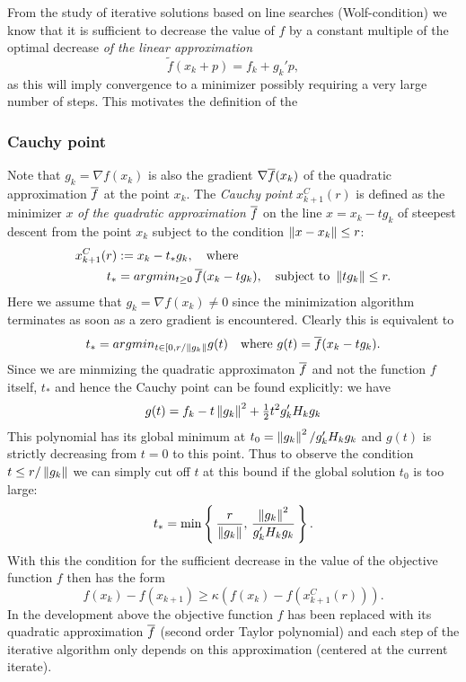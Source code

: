 From the study of iterative solutions based on line searches (Wolf-condition) we know that it
is sufficient to decrease the value of $f$ by a constant multiple of the optimal decrease 
\textit{of the linear approximation}
%
\begin{equation}
\label{TP1}
\tilde f(x_k+p) = f_k + g_k'p,
\end{equation}  
%
as this will imply convergence to a minimizer possibly requiring a very large number of steps.
This motivates the definition of the 

\subsubsection{Cauchy point}
\label{subsubsec:CauchyPoint} 

Note that $g_k=\nabla f(x_k)$ is also the gradient $\nabla\overline f(x_k)$ of the quadratic 
approximation $\overline f$ at the point $x_k$. The \textit{Cauchy point}  $x^C_{k+1}(r)$ is defined 
as the minimizer $x$ \textit{of the quadratic approximation} $\overline f$ on the line $x=x_k-tg_k$ 
of steepest descent from the point $x_k$ subject to the condition $\left\|x-x_k\right\|\leq r$:
%
\begin{align}
\label{Cauchy point}
x^C_{k+1}(r) &:= x_k-t_*g_k,\quad\text{where}\\
t_* &= argmin_{t\geq 0}\thinspace\overline f(x_k-tg_k),\quad\text{subject to }\left\|tg_k\right\|\leq r.
\end{align}
%
Here we assume that $g_k=\nabla f(x_k)\neq 0$ since the minimization algorithm terminates 
as soon as a zero gradient is encountered. Clearly this is equivalent to
$$
t_* = argmin_{t\in[0,r/\left\|g_k\right\|}g(t)\quad\text{where }g(t)=\overline f(x_k-tg_k).
$$
Since we are minmizing the quadratic approximaton $\overline f$ and not the function $f$ itself,
$t_*$ and hence the Cauchy point can be found explicitly: we have
$$
g(t)=f_k-t\left\|g_k\right\|^2+\tfrac{1}{2}t^2g_k'H_kg_k
$$
This polynomial has its global minimum at $t_0=\left\|g_k\right\|^2/g_k'H_kg_k$ and $g(t)$ is strictly 
decreasing from $t=0$ to this point. Thus to observe the condition $t\leq r/\left\|g_k\right\|$ we can
simply cut off $t$ at this bound if the global solution $t_0$ is too large:
%
\begin{equation}
\label{t_*}
t_* = \min\left\{\thinspace
\frac{r}{\left\|g_k\right\|},\thinspace\frac{\left\|g_k\right\|^2}{g_k'H_kg_k}\thinspace\right\}.
\end{equation}
%    
With this the condition for the sufficient 
decrease in the value of the objective function $f$ then has the form
%
\begin{equation}
\label{sufficient_decrease}
f(x_k)-f(x_{k+1})\geq\kappa(f(x_k)-f(x^C_{k+1}(r))).
\end{equation}  
%
In the development above the objective function $f$ has been replaced with its quadratic 
approximation $\overline f$ (second order Taylor polynomial) and each step of the iterative
algorithm only depends on this approximation (centered at the current iterate). 

